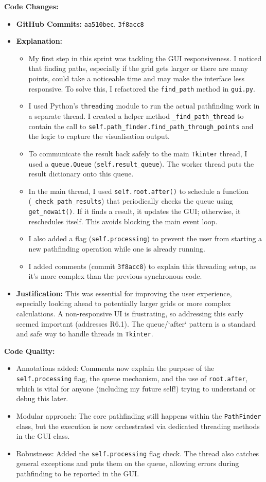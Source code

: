 \textbf{Code Changes:}
\begin{itemize}
	\item \textbf{GitHub Commits:} \verb|aa510bec|, \verb|3f8acc8|
	\item \textbf{Explanation:}
	\begin{itemize}
		\item My first step in this sprint was tackling the GUI responsiveness. I noticed that finding paths, especially if the grid gets larger or there are many points, could take a noticeable time and may make the interface less responsive. To solve this, I refactored the \verb|find_path| method in \verb|gui.py|.
		\item I used Python's \verb|threading| module to run the actual pathfinding work in a separate thread. I created a helper method \verb|_find_path_thread| to contain the call to \verb|self.path_finder.find_path_through_points| and the logic to capture the visualisation output.
		\item To communicate the result back safely to the main \verb|Tkinter| thread, I used a \verb|queue.Queue| (\verb|self.result_queue|). The worker thread puts the result dictionary onto this queue.
		\item In the main thread, I used \verb|self.root.after()| to schedule a function (\verb|_check_path_results|) that periodically checks the queue using \verb|get_nowait()|. If it finds a result, it updates the GUI; otherwise, it reschedules itself. This avoids blocking the main event loop.
		\item I also added a flag (\verb|self.processing|) to prevent the user from starting a new pathfinding operation while one is already running.
		\item I added comments (commit \verb|3f8acc8|) to explain this threading setup, as it's more complex than the previous synchronous code.
	\end{itemize}
	\item \textbf{Justification:} This was essential for improving the user experience, especially looking ahead to potentially larger grids or more complex calculations. A non-responsive UI is frustrating, so addressing this early seemed important (addresses R6.1). The queue/`after` pattern is a standard and safe way to handle threads in \verb|Tkinter|.
\end{itemize}

\textbf{Code Quality:}
\begin{itemize}
	\item Annotations added: Comments now explain the purpose of the \verb|self.processing| flag, the queue mechanism, and the use of \verb|root.after|, which is vital for anyone (including my future self!) trying to understand or debug this later.
	\item Modular approach: The core pathfinding still happens within the \verb|PathFinder| class, but the execution is now orchestrated via dedicated threading methods in the GUI class.
	\item Robustness: Added the \verb|self.processing| flag check. The thread also catches general exceptions and puts them on the queue, allowing errors during pathfinding to be reported in the GUI.
\end{itemize}

